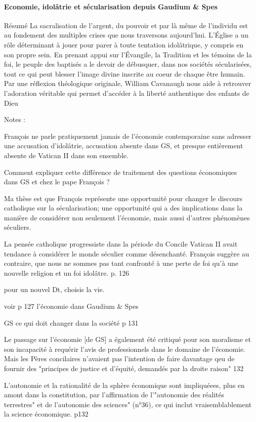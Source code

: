     \paragraph{
   Economie, idolâtrie et sécularisation depuis Gaudium \& Spes}
    \cite{cavanaugh_idolatrie_2022}
    Résumé 	La sacralisation de l'argent, du pouvoir et par là même de l'individu est au fondement des multiples crises que nous traversons aujourd'hui. L'Église a un rôle déterminant à jouer pour parer à toute tentation idolâtrique, y compris en son propre sein. En prenant appui sur l'Évangile, la Tradition et les témoins de la foi, le peuple des baptisés a le devoir de débusquer, dans nos sociétés sécularisées, tout ce qui peut blesser l'image divine inscrite au coeur de chaque être humain. Par une réflexion théologique originale, William Cavanaugh nous aide à retrouver l'adoration véritable qui permet d'accéder à la liberté authentique des enfants de Dieu
    
    Notes :
\begin{singlequote}
François ne parle pratiquement jamais de l’économie contemporaine sans adresser une accusation d’idolâtrie, accusation absente dans GS, et presque entièrement absente de Vatican II dans son ensemble.

Comment expliquer cette différence de traitement des questions économiques dans GS et chez le pape François ?

Ma thèse est que François représente une opportunité pour changer le discours catholique sur la sécularisation; une opportunité qui a des implications dans la manière de considérer non seulement l’économie, mais aussi d’autres phénomènes séculiers.

La pensée catholique progressiste dans la période du Concile Vatican II avait tendance à considérer le monde séculier comme désenchanté. François suggère au contraire, que nous ne sommes pas tant confronté à une perte de foi qu’à une nouvelle religion et un foi idolâtre. p. 126
\end{singlequote}

        pour un nouvel Dt, choisis la vie.

        voir p 127 l’économie dans Gaudium \& Spes

GS ce qui doit changer dans la société p 131        
\begin{singlequote}
Le passage sur l'économie [de GS] a également été critiqué pour son moralisme et son incapacité à requérir l'avis de professionnels dans le domaine de l'économie. Mais les Pères concilaires n'avaient pas l'intention de faire davantage qeu de fournir des "principes de justice et d'équité, demandés par la droite raison" 132


L'autonomie et la rationalité de la sphère économique sont impliquéees, plus en amont dans la constitution, par l'affirmation de l'"autonomie des réalités terrestres" et de l'autonomie des sciences" (n°36), ce qui inclut vraisemblablement la science économique. p132

\end{singlequote}        

